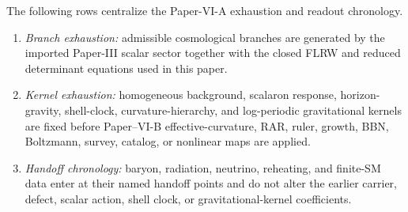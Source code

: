 \documentclass[12pt,a4paper]{article}
\begin{document}
\begin{definition}
\label{p8:def:exhaustion-readout-chronology-ledger}
The following rows centralize the Paper-VI-A exhaustion and readout chronology.
\begin{enumerate}[label=(\roman*), leftmargin=2em]
\item \emph{Branch exhaustion:} admissible cosmological branches are generated by the imported Paper-III scalar sector together with the closed FLRW and reduced determinant equations used in this paper.
\item \emph{Kernel exhaustion:} homogeneous background, scalaron response, horizon-gravity, shell-clock, curvature-hierarchy, and log-periodic gravitational kernels are fixed before Paper--VI-B effective-curvature, RAR, ruler, growth, BBN, Boltzmann, survey, catalog, or nonlinear maps are applied.
\item \emph{Handoff chronology:} baryon, radiation, neutrino, reheating, and finite-SM data enter at their named handoff points and do not alter the earlier carrier, defect, scalar action, shell clock, or gravitational-kernel coefficients.
\end{enumerate}
\end{definition}
\end{document}
